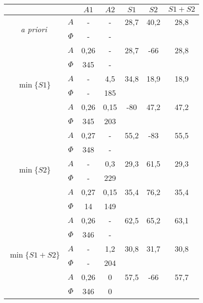 \documentclass[polish,a4paper,11pt]{mwart}
\begin{document}
  \begin{table}[!tbh]
    \centering
    \begin{tabular}{|c|c|c|c|c|c|c|}
      \cline{3-7}
      \multicolumn{2}{c|}{}&$A1$&$A2$&$S1$&$S2$&$S1+S2$\\\hline
      \multirow{2}{*}{\textit{a priori}} & $A$ & - & - & 28,7 & 40,2 & 28,8\\\cline{2-7}
					 & $\Phi$ & - & - & \multicolumn{3}{c}{}\\\hline
      \multirow{6}{*}{$\min\{S1\}$}   &   $A$ & 0,26 & - & 28,7 & -66 & 28,8\\\cline{2-7}
				      &$\Phi$ & 345 & - & \multicolumn{3}{c}{}\\\cline{2-7}
				      &   $A$ & - & 4,5 & 34,8 & 18,9 & 18,9\\\cline{2-7}
				      &$\Phi$ & - & 185 & \multicolumn{3}{c}{}\\\cline{2-7}
				      &   $A$ & 0,26 & 0,15 & -80 & 47,2 & 47,2\\\cline{2-7}
				      &$\Phi$ & 345 & 203 & \multicolumn{3}{c}{}\\\hline
      \multirow{6}{*}{$\min\{S2\}$}   &   $A$ & 0,27 & - & 55,2 & -83 & 55,5\\\cline{2-7}
				      &$\Phi$ & 348 & - & \multicolumn{3}{c}{}\\\cline{2-7}
				      &   $A$ & - & 0,3 & 29,3 & 61,5 & 29,3\\\cline{2-7}
				      &$\Phi$ & - & 229 & \multicolumn{3}{c}{}\\\cline{2-7}
				      &   $A$ & 0,27 & 0,15 & 35,4 & 76,2 & 35,4\\\cline{2-7}
				      &$\Phi$ & 14 & 149 & \multicolumn{3}{c}{}\\\hline
      \multirow{6}{*}{$\min\{S1+S2\}$}&   $A$ & 0,26 & - & 62,5 & 65,2 & 63,1\\\cline{2-7}
				      &$\Phi$ & 346 & - & \multicolumn{3}{c}{}\\\cline{2-7}
				      &   $A$ & - & 1,2 & 30,8 & 31,7 & 30,8\\\cline{2-7}
				      &$\Phi$ & - & 204 & \multicolumn{3}{c}{}\\\cline{2-7}
				      &   $A$ & 0,26 & 0 & 57,5 & -66 & 57,7\\\cline{2-7}
				      &$\Phi$ & 346 & 0 & \multicolumn{3}{c}{}\\\cline{1-4}
    \end{tabular}
  \end{table}
\end{document}
